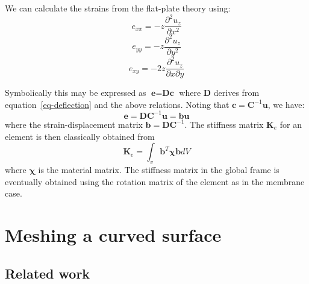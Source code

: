 \documentclass{llncs}
\begin{document}
We can calculate the strains from the flat-plate theory using:
\begin{equation}
e_{xx} = -z \frac{\partial^2u_z}{\partial x^2}
\end{equation} 
\begin{equation}
e_{yy} = -z \frac{\partial^2u_z}{\partial y^2}
\end{equation} 
\begin{equation}
e_{xy} = -2z \frac{\partial^2u_z}{\partial x \partial y}
\end{equation} 

Symbolically this may be expressed as $\textbf{e} = \textbf{Dc}$ where $\textbf{D}$ derives from equation~\ref{eq-deflection} and the above relations. Noting that $\textbf{c} = \textbf{C}^{-1}\textbf{u}$, we have:
\begin{equation}
\textbf{e} = \textbf{DC}^{-1}\textbf{u} = \textbf{bu}
\end{equation} 
where the strain-displacement matrix $\textbf{b} = \textbf{DC}^{-1}$. 
The stiffness matrix $\textbf{K}_e$ for an element is then classically obtained from
\begin{equation}
\textbf{K}_e = \int_v \textbf{b}^{T} \boldsymbol\chi \textbf{b} dV
\end{equation} 
where $\boldsymbol\chi$ is the material matrix. The stiffness matrix in the global frame is eventually obtained using the rotation matrix of the element as in the membrane case. 

\section{Meshing a curved surface}

\subsection{Related work}
\end{document}

